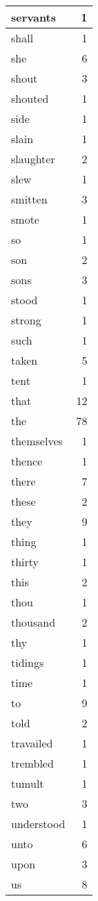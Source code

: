 \begin{center}
\begin{longtable}{l|r}
servants & 1 \\ \hline
shall & 1 \\ \hline
she & 6 \\ \hline
shout & 3 \\ \hline
shouted & 1 \\ \hline
side & 1 \\ \hline
slain & 1 \\ \hline
slaughter & 2 \\ \hline
slew & 1 \\ \hline
smitten & 3 \\ \hline
smote & 1 \\ \hline
so & 1 \\ \hline
son & 2 \\ \hline
sons & 3 \\ \hline
stood & 1 \\ \hline
strong & 1 \\ \hline
such & 1 \\ \hline
taken & 5 \\ \hline
tent & 1 \\ \hline
that & 12 \\ \hline
the & 78 \\ \hline
themselves & 1 \\ \hline
thence & 1 \\ \hline
there & 7 \\ \hline
these & 2 \\ \hline
they & 9 \\ \hline
thing & 1 \\ \hline
thirty & 1 \\ \hline
this & 2 \\ \hline
thou & 1 \\ \hline
thousand & 2 \\ \hline
thy & 1 \\ \hline
tidings & 1 \\ \hline
time & 1 \\ \hline
to & 9 \\ \hline
told & 2 \\ \hline
travailed & 1 \\ \hline
trembled & 1 \\ \hline
tumult & 1 \\ \hline
two & 3 \\ \hline
understood & 1 \\ \hline
unto & 6 \\ \hline
upon & 3 \\ \hline
us & 8 \\ \hline

\end{longtable}
\end{center}
